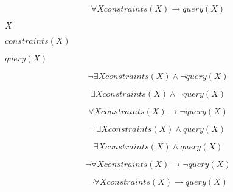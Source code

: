 \documentclass{article}
\begin{document}
\[ \forall X constraints(X) \to query(X) \]
\pagebreak

$X$
\pagebreak

$constraints(X)$
\pagebreak

$query(X)$
\pagebreak

\[ \lnot \exists X constraints(X) \land \lnot query(X) \]
\pagebreak

\[ \exists X constraints(X) \land \lnot query(X) \]
\pagebreak

\[ \forall X constraints(X) \to \lnot query(X) \]
\pagebreak

\[ \lnot \exists X constraints(X) \land query(X) \]
\pagebreak

\[ \exists X constraints(X) \land query(X) \]
\pagebreak

\[ \lnot \forall X constraints(X) \to \lnot query(X) \]
\pagebreak

\[ \lnot \forall X constraints(X) \to query(X) \]
\pagebreak
\end{document}
